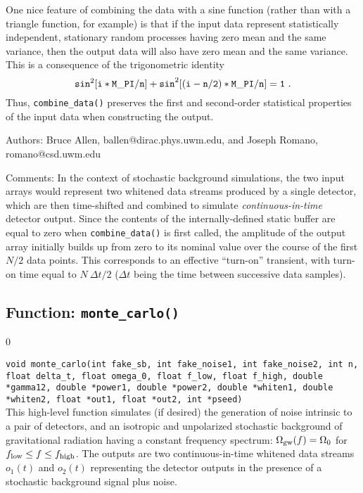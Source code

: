 One nice feature of combining the data with a sine function 
(rather than with a triangle function, for example) is that if the
input data represent statistically independent, stationary random 
processes having zero mean and the same variance, then the output 
data will also have zero mean and the same variance.
This is a consequence of the trigonometric identity
%
\begin{equation}
{\tt sin}^2{\tt [i*M\_PI/n]+sin}^2{\tt [(i-n/2)*M\_PI/n]=1}\ .
\end{equation}
%
Thus, {\tt combine\_data()} preserves the first and second-order 
statistical properties of the input data when constructing the output.

%
\begin{description}
\item{Authors:}
Bruce Allen, ballen@dirac.phys.uwm.edu, and Joseph Romano, romano@csd.uwm.edu
\item{Comments:}
In the context of stochastic background simulations, the two input arrays
would represent two whitened data streams produced by a single detector, 
which are then time-shifted and combined to simulate {\it continuous-in-time} 
detector output.
Since the contents of the internally-defined static buffer are equal
to zero when {\tt combine\_data()} is first called, the amplitude of the
output array initially builds up from zero to its nominal value over the 
course of the first $N/2$ data points.
This corresponds to an effective ``turn-on'' transient, with turn-on time 
equal to $N\ \Delta t/2$ ($\Delta t$ being the time between successive data
samples).
\end{description}
\clearpage

\subsection{Function: {\tt monte\_carlo()}}
\label{subsec:monte_carlo}
\setcounter{equation}0

{\tt void monte\_carlo(int fake\_sb, int fake\_noise1, int fake\_noise2,
int n, float delta\_t, float omega\_0, float f\_low, float f\_high, 
double *gamma12, double *power1, double *power2,
double *whiten1, double *whiten2, float *out1, float *out2, int *pseed)}\\
%
This high-level function simulates (if desired) the generation of 
noise intrinsic to a pair of detectors, and an isotropic and 
unpolarized stochastic background of gravitational radiation having a 
constant frequency spectrum: 
$\Omega_{\rm gw}(f)=\Omega_0$ for $f_{\rm low}\le f \le f_{\rm high}$.
The outputs are two continuous-in-time whitened data streams $o_1(t)$ 
and $o_2(t)$ representing the detector outputs in the presence of a 
stochastic background signal plus noise.

